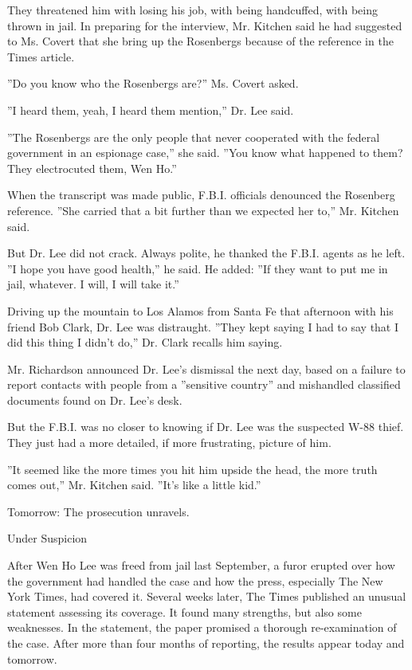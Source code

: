 They threatened him with losing his job, with being handcuffed, with
being thrown in jail. In preparing for the interview, Mr. Kitchen said
he had suggested to Ms. Covert that she bring up the Rosenbergs because
of the reference in the Times article.

''Do you know who the Rosenbergs are?'' Ms. Covert asked.

''I heard them, yeah, I heard them mention,'' Dr. Lee said.

''The Rosenbergs are the only people that never cooperated with the
federal government in an espionage case,'' she said. ''You know what
happened to them? They electrocuted them, Wen Ho.''

When the transcript was made public, F.B.I. officials denounced the
Rosenberg reference. ''She carried that a bit further than we expected
her to,'' Mr. Kitchen said.

But Dr. Lee did not crack. Always polite, he thanked the F.B.I. agents
as he left. ''I hope you have good health,'' he said. He added: ''If
they want to put me in jail, whatever. I will, I will take it.''

Driving up the mountain to Los Alamos from Santa Fe that afternoon with
his friend Bob Clark, Dr. Lee was distraught. ''They kept saying I had
to say that I did this thing I didn't do,'' Dr. Clark recalls him
saying.

Mr. Richardson announced Dr. Lee's dismissal the next day, based on a
failure to report contacts with people from a ''sensitive country'' and
mishandled classified documents found on Dr. Lee's desk.

But the F.B.I. was no closer to knowing if Dr. Lee was the suspected
W-88 thief. They just had a more detailed, if more frustrating, picture
of him.

''It seemed like the more times you hit him upside the head, the more
truth comes out,'' Mr. Kitchen said. ''It's like a little kid.''

Tomorrow: The prosecution unravels.

Under Suspicion

After Wen Ho Lee was freed from jail last September, a furor erupted
over how the government had handled the case and how the press,
especially The New York Times, had covered it. Several weeks later, The
Times published an unusual statement assessing its coverage. It found
many strengths, but also some weaknesses. In the statement, the paper
promised a thorough re-examination of the case. After more than four
months of reporting, the results appear today and tomorrow.

